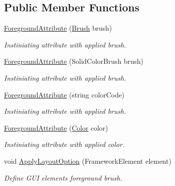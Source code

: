 \subsection*{Public Member Functions}
\begin{DoxyCompactItemize}
\item 
\mbox{\hyperlink{class_wpf_handler_1_1_u_i_1_1_auto_layout_1_1_options_1_1_foreground_attribute_abae0ce13aea7130e5e9c72c208443380}{Foreground\+Attribute}} (\mbox{\hyperlink{class_wpf_handler_1_1_u_i_1_1_color_attribute_afa14c4542d8023b3ddad6aba74993877}{Brush}} brush)
\begin{DoxyCompactList}\small\item\em Instiniating attribute with applied brush. \end{DoxyCompactList}\item 
\mbox{\hyperlink{class_wpf_handler_1_1_u_i_1_1_auto_layout_1_1_options_1_1_foreground_attribute_a3c0591313938a963293a9b2df51e130b}{Foreground\+Attribute}} (Solid\+Color\+Brush brush)
\begin{DoxyCompactList}\small\item\em Instiniating attribute with applied brush. \end{DoxyCompactList}\item 
\mbox{\hyperlink{class_wpf_handler_1_1_u_i_1_1_auto_layout_1_1_options_1_1_foreground_attribute_ae4e67116f7dcce84028e700262afd1cf}{Foreground\+Attribute}} (string color\+Code)
\begin{DoxyCompactList}\small\item\em Instiniating attribute with applied brush. \end{DoxyCompactList}\item 
\mbox{\hyperlink{class_wpf_handler_1_1_u_i_1_1_auto_layout_1_1_options_1_1_foreground_attribute_ab3c65b68928d5ad4ccedee5b7baa337c}{Foreground\+Attribute}} (\mbox{\hyperlink{class_wpf_handler_1_1_u_i_1_1_color_attribute_a6c5c2202427bd48877142ecf85327843}{Color}} color)
\begin{DoxyCompactList}\small\item\em Instiniating attribute with applied color. \end{DoxyCompactList}\item 
void \mbox{\hyperlink{class_wpf_handler_1_1_u_i_1_1_auto_layout_1_1_options_1_1_foreground_attribute_a5231ed2afb4d2d26eac9eab670adca45}{Apply\+Layout\+Option}} (Framework\+Element element)
\begin{DoxyCompactList}\small\item\em Define G\+UI element\textquotesingle{}s foreground brush. \end{DoxyCompactList}\end{DoxyCompactItemize}
